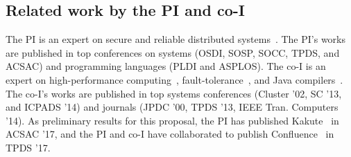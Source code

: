 \vspace{-.15in}\subsection{Related work by the PI and co-I} 
\label{sec:my-work}\vspace{-.075in}
% 

The PI is an expert on secure and reliable distributed 
systems~\cite{smt:cacm, cui:tern:osdi10, peregrine:sosp11,
parrot:sosp13, crane:sosp15, tripod:apsys16, kakute:acsac17, 
confluence:tpds17}. The PI's works are published in top conferences on systems 
(OSDI, SOSP, SOCC, TPDS, and ACSAC) and programming languages (PLDI and ASPLOS). 
The co-I is an expert on high-performance 
computing~\cite{powerrock,hwang,jessica,cheung,khokhar}, fault-tolerance~\cite{ 
sheng,shengdi1}, and Java compilers~\cite{rhymes,shengdi,jessica2}. The 
co-I's works are published in top systems conferences (Cluster '02, SC '13, 
and ICPADS '14) and journals (JPDC '00, TPDS '13, IEEE Tran. Computers '14). As 
preliminary results for this proposal, the PI has published 
Kakute~\cite{kakute:acsac17} in ACSAC '17, and the PI and co-I have collaborated 
to publish Confluence~\cite{confluence:tpds17} in TPDS '17.


